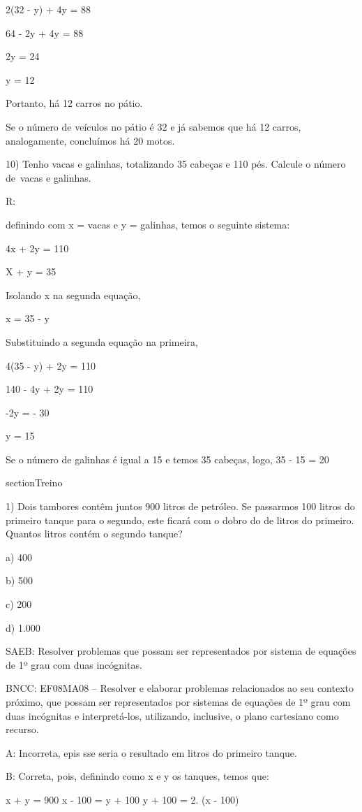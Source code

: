 2(32 - y) + 4y = 88

64 - 2y + 4y = 88

2y = 24

y = 12

Portanto, há 12 carros no pátio.

Se o número de veículos no pátio é 32 e já sabemos que há 12 carros,
analogamente, concluímos há 20 motos.

10) Tenho vacas e galinhas, totalizando 35 cabeças e 110 pés. Calcule o
número de~vacas e galinhas.

R:

definindo com x = vacas e y = galinhas, temos o seguinte sistema:

4x + 2y = 110

X + y = 35

Isolando x na segunda equação,

x = 35 - y

Substituindo a segunda equação na primeira,

4(35 - y) + 2y = 110

140 - 4y + 2y = 110

-2y = - 30

y = 15

Se o número de galinhas é igual a 15 e temos 35 cabeças, logo, 35 - 15 =
20

section{Treino}

1) Dois tambores contêm juntos 900 litros de petróleo. Se passarmos 100
litros do primeiro tanque para o segundo, este ficará com o dobro do de
litros do primeiro. Quantos litros contém o segundo tanque?

a) 400

b) 500

c) 200

d) 1.000

SAEB: Resolver problemas que possam ser representados por sistema de
equações de 1º grau com duas incógnitas.

BNCC: EF08MA08 -- Resolver e elaborar problemas relacionados ao seu
contexto próximo, que possam ser representados por sistemas de equações
de 1º grau com duas incógnitas e interpretá-los, utilizando, inclusive,
o plano cartesiano como recurso.

A: Incorreta, epis sse seria o resultado em litros do primeiro tanque.

B: Correta, pois, definindo como x e y os tanques, temos que:

x + y = 900 x - 100 = y + 100 y + 100 = 2. (x - 100)


